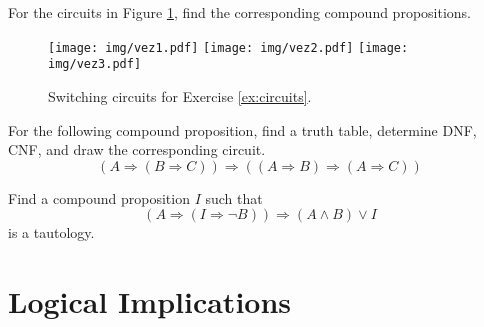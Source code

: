 \documentclass[11pt,paper=b5,footinclude,headinclude]{scrbook} %
\theoremstyle{remark}
\theoremstyle{definition} %
\theoremstyle{theorem} %
\newtheorem{ex}{Exercise\hypertarget{sol:\theex}}[chapter]
\begin{document}
     \begin{ex} For the circuits in Figure \ref{fig:circuits}, find the corresponding compound propositions.\label{ex:circuits}


\begin{figure}
    \centering
    \texttt{[image: img/vez1.pdf]}
    \texttt{[image: img/vez2.pdf]}
    \texttt{[image: img/vez3.pdf]}
    \caption{Switching circuits for Exercise \ref{ex:circuits}.}
    \label{fig:circuits}
\end{figure}



    \end{ex} \begin{ex} For the following compound proposition, find a truth table, determine DNF, CNF, and draw the corresponding circuit.
\[
(A \Rightarrow (B \Rightarrow C)) \Rightarrow ((A \Rightarrow B) \Rightarrow (A \Rightarrow C))
\]
    \end{ex} \begin{ex} Find a compound proposition $I$ such that
\[
(A \Rightarrow (I \Rightarrow \neg B)) \Rightarrow (A \land B) \lor I
\]
is a tautology.
\end{ex}


\section{Logical Implications}
\end{document}
